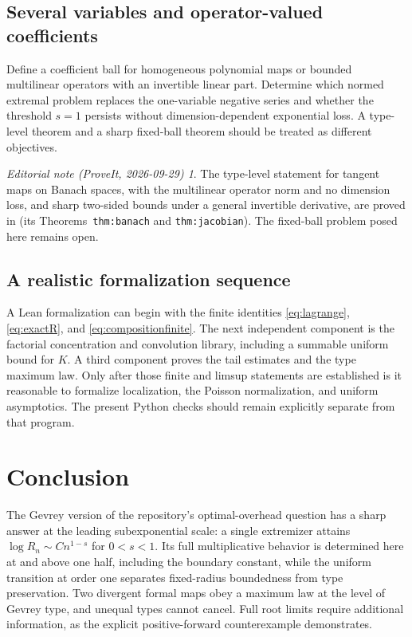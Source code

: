 \documentclass[11pt,a4paper]{article}
\theoremstyle{definition}
\theoremstyle{remark}
\newtheorem*{ednote}{Editorial note (ProveIt, 2026-09-29)}
\numberwithin{equation}{section}
\begin{document}
\subsection{Several variables and operator-valued coefficients}
Define a coefficient ball for homogeneous polynomial maps or bounded
multilinear operators with an invertible linear part. Determine which
normed extremal problem replaces the one-variable negative series and
whether the threshold $s=1$ persists without dimension-dependent
exponential loss. A type-level theorem and a sharp fixed-ball theorem
should be treated as different objectives.
\begin{ednote}
The type-level statement for tangent maps on Banach spaces, with the
multilinear operator norm and no dimension loss, and sharp two-sided bounds
under a general invertible derivative, are proved in
 (its
Theorems~\texttt{thm:banach} and \texttt{thm:jacobian}). The fixed-ball
problem posed here remains open.
\end{ednote}

\subsection{A realistic formalization sequence}
A Lean formalization can begin with the finite identities
\eqref{eq:lagrange}, \eqref{eq:exactR}, and \eqref{eq:compositionfinite}.
The next independent component is the factorial concentration and
convolution library, including a summable uniform bound for $K$.
A third component proves the tail estimates and the type maximum law.
Only after those finite and limsup statements are established is it
reasonable to formalize localization, the Poisson normalization, and
uniform asymptotics. The present Python checks should remain explicitly
separate from that program.

\section{Conclusion}
The Gevrey version of the repository's optimal-overhead question has a
sharp answer at the leading subexponential scale: a single extremizer
attains $\log R_n\sim Cn^{1-s}$ for $0<s<1$. Its full multiplicative
behavior is determined here at and above one half, including the
boundary constant, while the uniform transition at order one separates
fixed-radius boundedness from type preservation. Two divergent formal
maps obey a maximum law at the level of Gevrey type, and unequal types
cannot cancel. Full root limits require additional information, as the
explicit positive-forward counterexample demonstrates.
\end{document}
